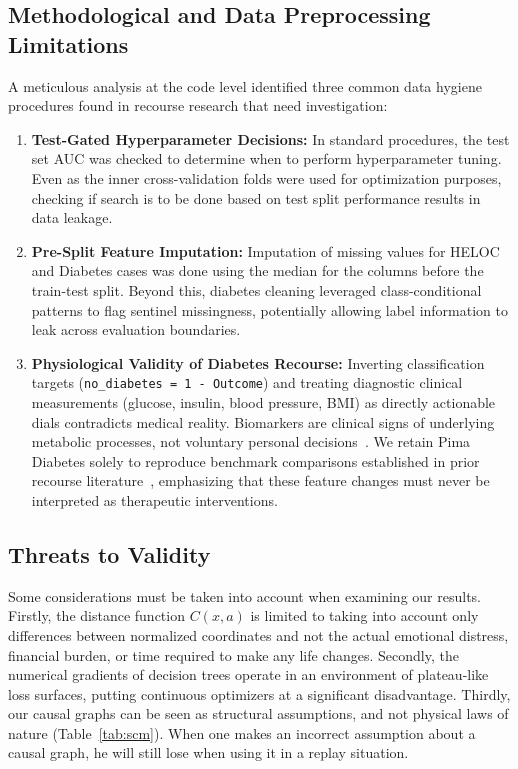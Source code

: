 \documentclass[nolineno]{paper/ieee-access/ieeeaccess}%
\newcommand{\artifact}[1]{\nolinkurl{#1}}
\begin{document}
\subsection{Methodological and Data Preprocessing Limitations}
\label{sec:limitations}
A meticulous analysis at the code level identified three common data hygiene procedures found in recourse research that need investigation:
\begin{enumerate}
\item \textbf{Test-Gated Hyperparameter Decisions:} In standard procedures, the test set AUC was checked to determine when to perform hyperparameter tuning. Even as the inner cross-validation folds were used for optimization purposes, checking if search is to be done based on test split performance results in data leakage.
\item \textbf{Pre-Split Feature Imputation:} Imputation of missing values for HELOC and Diabetes cases was done using the median for the columns before the train-test split. Beyond this, diabetes cleaning leveraged class-conditional patterns to flag sentinel missingness, potentially allowing label information to leak across evaluation boundaries.
\item \textbf{Physiological Validity of Diabetes Recourse:} Inverting classification targets (\artifact{no_diabetes = 1 - Outcome}) and treating diagnostic clinical measurements (glucose, insulin, blood pressure, BMI) as directly actionable dials contradicts medical reality. Biomarkers are clinical signs of underlying metabolic processes, not voluntary personal decisions~\cite{smith1988diabetes}. We retain Pima Diabetes solely to reproduce benchmark comparisons established in prior recourse literature~\cite{pawelczyk2021carla, klaise2021alibi}, emphasizing that these feature changes must never be interpreted as therapeutic interventions.
\end{enumerate}

\subsection{Threats to Validity}
Some considerations must be taken into account when examining our results. Firstly, the distance function $C(x, a)$ is limited to taking into account only differences between normalized coordinates and not the actual emotional distress, financial burden, or time required to make any life changes. Secondly, the numerical gradients of decision trees operate in an environment of plateau-like loss surfaces, putting continuous optimizers at a significant disadvantage. Thirdly, our causal graphs can be seen as structural assumptions, and not physical laws of nature (Table~\ref{tab:scm}). When one makes an incorrect assumption about a causal graph, he will still lose when using it in a replay situation.
\end{document}
